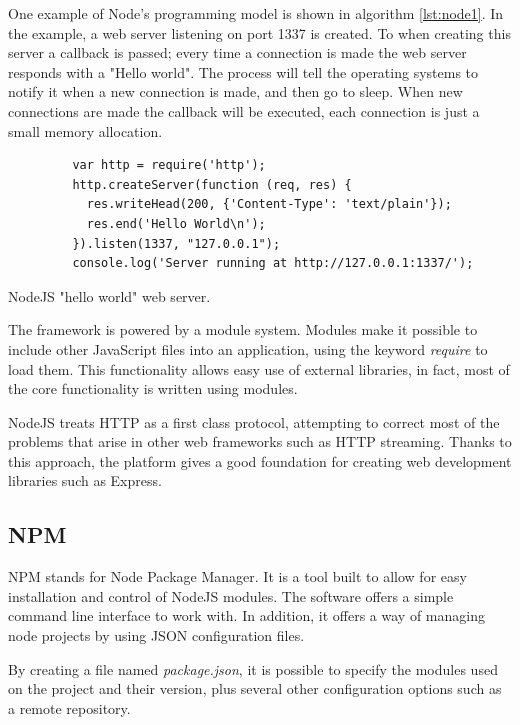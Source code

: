 One example of Node's programming model is shown in algorithm \ref{lst:node1}. In the example, a web server listening on port 1337 is created. To when creating this server a callback is passed; every time a connection is made the web server responds with a "Hello world". The process will tell the operating systems to notify it when a new connection is made, and then go to sleep. When new connections are made the callback will be executed, each connection is just a small memory allocation.

\begin{listing}\centering
  \begin{minipage}{.6\textwidth}
    \begin{verbatim}
	     var http = require('http');
	     http.createServer(function (req, res) {
	       res.writeHead(200, {'Content-Type': 'text/plain'});
	       res.end('Hello World\n');
	     }).listen(1337, "127.0.0.1");
	     console.log('Server running at http://127.0.0.1:1337/');
    \end{verbatim}
  \end{minipage}
  \caption{NodeJS "hello world" web server.}\label{lst:node1}
\end{listing}

The framework is powered by a module system. Modules make it possible to include other JavaScript files into an application, using the keyword \textit{require} to load them. This functionality allows easy use of external libraries, in fact, most of the core functionality is written using modules.

NodeJS treats HTTP as a first class protocol, attempting to correct most of the problems that arise in other web frameworks such as HTTP streaming. Thanks to this approach, the platform gives a good foundation for creating web development libraries such as Express.

\subsection*{NPM}

NPM stands for Node Package Manager. It is a tool built to allow for easy installation and control of NodeJS modules. The software offers a simple command line interface to work with. In addition, it offers a way of managing node projects by using JSON configuration files.

By creating a file named \textit{package.json}, it is possible to specify the modules used on the project and their version, plus several other configuration options such as a remote repository.

